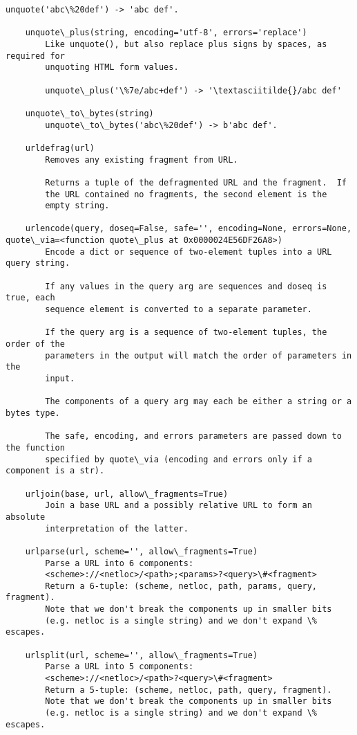 \documentclass[11pt]{article}
\begin{document}
\begin{Verbatim}[commandchars=\\\{\}]
        unquote('abc\%20def') -> 'abc def'.
    
    unquote\_plus(string, encoding='utf-8', errors='replace')
        Like unquote(), but also replace plus signs by spaces, as required for
        unquoting HTML form values.
        
        unquote\_plus('\%7e/abc+def') -> '\textasciitilde{}/abc def'
    
    unquote\_to\_bytes(string)
        unquote\_to\_bytes('abc\%20def') -> b'abc def'.
    
    urldefrag(url)
        Removes any existing fragment from URL.
        
        Returns a tuple of the defragmented URL and the fragment.  If
        the URL contained no fragments, the second element is the
        empty string.
    
    urlencode(query, doseq=False, safe='', encoding=None, errors=None, quote\_via=<function quote\_plus at 0x0000024E56DF26A8>)
        Encode a dict or sequence of two-element tuples into a URL query string.
        
        If any values in the query arg are sequences and doseq is true, each
        sequence element is converted to a separate parameter.
        
        If the query arg is a sequence of two-element tuples, the order of the
        parameters in the output will match the order of parameters in the
        input.
        
        The components of a query arg may each be either a string or a bytes type.
        
        The safe, encoding, and errors parameters are passed down to the function
        specified by quote\_via (encoding and errors only if a component is a str).
    
    urljoin(base, url, allow\_fragments=True)
        Join a base URL and a possibly relative URL to form an absolute
        interpretation of the latter.
    
    urlparse(url, scheme='', allow\_fragments=True)
        Parse a URL into 6 components:
        <scheme>://<netloc>/<path>;<params>?<query>\#<fragment>
        Return a 6-tuple: (scheme, netloc, path, params, query, fragment).
        Note that we don't break the components up in smaller bits
        (e.g. netloc is a single string) and we don't expand \% escapes.
    
    urlsplit(url, scheme='', allow\_fragments=True)
        Parse a URL into 5 components:
        <scheme>://<netloc>/<path>?<query>\#<fragment>
        Return a 5-tuple: (scheme, netloc, path, query, fragment).
        Note that we don't break the components up in smaller bits
        (e.g. netloc is a single string) and we don't expand \% escapes.
    

\end{Verbatim}
\end{document}
